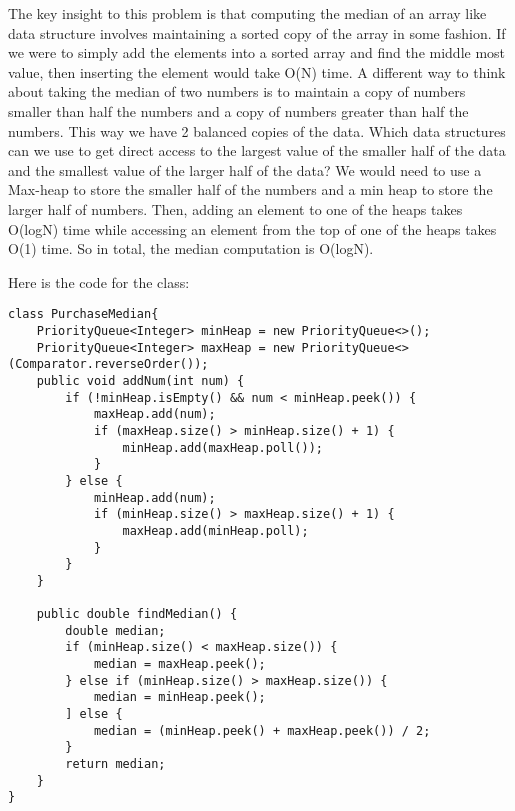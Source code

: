 \begin{solution}
The key insight to this problem is that computing the median of an array like data
structure involves maintaining a sorted copy of the array in some fashion. If we were to simply add the elements into a sorted array and find the middle most value, then inserting the element would take O(N) time. A different way to think about taking the median of two numbers is to maintain a copy of numbers smaller than half the numbers and a copy of numbers greater than half the numbers. This way we have 2 balanced copies of the data. Which data structures can we use to get direct access to the largest value of the smaller half of the data and the smallest value of the larger half of the data? We would need to use a Max-heap to store the smaller half of the numbers and a min heap to store the larger half of numbers. Then, adding an element to one of the heaps takes O(logN) time while accessing an element from the top of one of the heaps takes O(1) time. So in total, the median computation is O(logN). 

Here is the code for the class:
\begin{lstlisting}
class PurchaseMedian{
    PriorityQueue<Integer> minHeap = new PriorityQueue<>();
    PriorityQueue<Integer> maxHeap = new PriorityQueue<>(Comparator.reverseOrder());
    public void addNum(int num) {
        if (!minHeap.isEmpty() && num < minHeap.peek()) {
            maxHeap.add(num);
            if (maxHeap.size() > minHeap.size() + 1) {
                minHeap.add(maxHeap.poll());
            }
        } else {
            minHeap.add(num);
            if (minHeap.size() > maxHeap.size() + 1) {
                maxHeap.add(minHeap.poll);
            }
        }
    }
    
    public double findMedian() {
        double median;
        if (minHeap.size() < maxHeap.size()) {
            median = maxHeap.peek();
        } else if (minHeap.size() > maxHeap.size()) {
            median = minHeap.peek();
        ] else {
            median = (minHeap.peek() + maxHeap.peek()) / 2;
        }
        return median;
    }
}
\end{lstlisting}

\end{solution}
